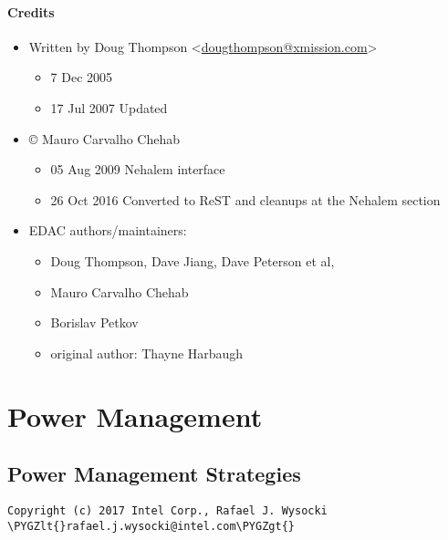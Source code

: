 \documentclass[a4paper,8pt,english]{sphinxmanual}
\def\PYGZlt{\char`\<}
\def\PYGZgt{\char`\>}
\begin{document}
\subsubsection{Credits}
\label{admin-guide/ras:credits}\begin{itemize}
\item {} 
Written by Doug Thompson \textless{}\href{mailto:dougthompson@xmission.com}{dougthompson@xmission.com}\textgreater{}
\begin{itemize}
\item {} 
7 Dec 2005

\item {} 
17 Jul 2007 Updated

\end{itemize}

\item {} 
© Mauro Carvalho Chehab
\begin{itemize}
\item {} 
05 Aug 2009 Nehalem interface

\item {} 
26 Oct 2016 Converted to ReST and cleanups at the Nehalem section

\end{itemize}

\item {} 
EDAC authors/maintainers:
\begin{itemize}
\item {} 
Doug Thompson, Dave Jiang, Dave Peterson et al,

\item {} 
Mauro Carvalho Chehab

\item {} 
Borislav Petkov

\item {} 
original author: Thayne Harbaugh

\end{itemize}

\end{itemize}


\chapter{Power Management}
\label{admin-guide/pm/index::doc}\label{admin-guide/pm/index:power-management}

\section{Power Management Strategies}
\label{admin-guide/pm/strategies::doc}\label{admin-guide/pm/strategies:power-management-strategies}
\begin{Verbatim}[commandchars=\\\{\}]
Copyright (c) 2017 Intel Corp., Rafael J. Wysocki \PYGZlt{}rafael.j.wysocki@intel.com\PYGZgt{}
\end{Verbatim}
\end{document}
